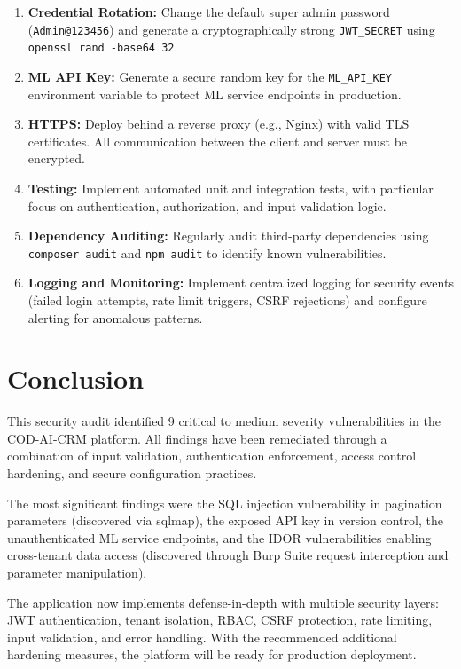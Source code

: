 \documentclass[12pt,a4paper]{article}
\begin{document}
\begin{enumerate}
  \item \textbf{Credential Rotation:} Change the default super admin password (\texttt{Admin@123456}) and generate a cryptographically strong \texttt{JWT\_SECRET} using \texttt{openssl rand -base64 32}.
  \item \textbf{ML API Key:} Generate a secure random key for the \texttt{ML\_API\_KEY} environment variable to protect ML service endpoints in production.
  \item \textbf{HTTPS:} Deploy behind a reverse proxy (e.g., Nginx) with valid TLS certificates. All communication between the client and server must be encrypted.
  \item \textbf{Testing:} Implement automated unit and integration tests, with particular focus on authentication, authorization, and input validation logic.
  \item \textbf{Dependency Auditing:} Regularly audit third-party dependencies using \texttt{composer audit} and \texttt{npm audit} to identify known vulnerabilities.
  \item \textbf{Logging and Monitoring:} Implement centralized logging for security events (failed login attempts, rate limit triggers, CSRF rejections) and configure alerting for anomalous patterns.
\end{enumerate}

\section{Conclusion}

This security audit identified 9 critical to medium severity vulnerabilities in the COD-AI-CRM platform. All findings have been remediated through a combination of input validation, authentication enforcement, access control hardening, and secure configuration practices.

The most significant findings were the SQL injection vulnerability in pagination parameters (discovered via sqlmap), the exposed API key in version control, the unauthenticated ML service endpoints, and the IDOR vulnerabilities enabling cross-tenant data access (discovered through Burp Suite request interception and parameter manipulation).

The application now implements defense-in-depth with multiple security layers: JWT authentication, tenant isolation, RBAC, CSRF protection, rate limiting, input validation, and error handling. With the recommended additional hardening measures, the platform will be ready for production deployment.
\end{document}
